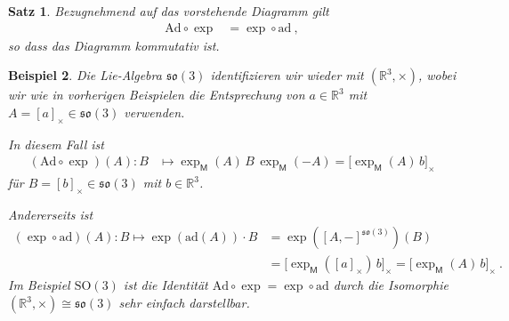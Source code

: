 \documentclass[10pt,a4paper]{article}
\theoremstyle{mytheorem}
\newtheorem{theorem}{Satz}[section]
\theoremstyle{mydefinition}
\newtheorem{example}[theorem]{Beispiel}
\newcommand{\ad}{\mathrm{ad}}
\newcommand{\Ad}{\mathrm{Ad}}
\newcommand{\SO}{\mathrm{SO}}
\newcommand{\fso}{\mathfrak{so}}
\begin{document}
\begin{theorem}
\label{th:AdExp}
Bezugnehmend auf das vorstehende Diagramm gilt
\begin{align*}
	\Ad\circ\exp &= \exp\circ\ad
	\ ,
\end{align*}
so dass das Diagramm kommutativ ist.
\end{theorem}

\begin{example}
Die Lie-Algebra $\fso(3)$ identifizieren wir wieder mit $(\mathbb{R}^3,\times)$, wobei wir wie in vorherigen Beispielen die Entsprechung von $a\in\mathbb{R}^3$ mit $A=[a]_\times\in\fso(3)$ verwenden.

In diesem Fall ist
\begin{align*}
	(\Ad\circ\exp)(A): 
	B &\mapsto
	\exp_\mathsf{M}(A)\,B\,\exp_\mathsf{M}(-A)
	= 
	\big[	
		\exp_\mathsf{M}(A)\,b
	\big]_\times
\end{align*}
für $B=[b]_\times\in\fso(3)$ mit $b\in\mathbb{R}^3$.

Andererseits ist
\begin{align*}
	(\exp\circ\ad)(A):
	B \mapsto
	\exp(\ad(A))\cdot B
	&= \exp([A,-]^{\fso(3)})(B)
	\nonumber\\
	&=
	\big[
		\exp_\mathsf{M}([a]_\times)\,b
	\big]_\times
	= \big[
		\exp_\mathsf{M}(A)\,b
	\big]_\times	
	\ .
\end{align*}
Im Beispiel $\SO(3)$ ist die Identität $\Ad\circ\exp=\exp\circ\ad$ durch die Isomorphie $(\mathbb{R}^3,\times)\cong\fso(3)$ sehr einfach darstellbar.
\end{example}
\end{document}
